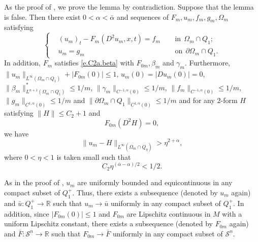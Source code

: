 \documentclass[preprint,12pt]{elsarticle}
\theoremstyle{definition}
\theoremstyle{remark}
\numberwithin{equation}{section}
\begin{document}
\proof As the proof of , we prove the lemma by contradiction. Suppose that the lemma is false. Then there exist $0<\alpha<\bar{\alpha}$ and sequences of $F_m,u_m,f_m,g_m,\Omega_m$ satisfying
\begin{equation*}
\left\{\begin{aligned}
&(u_m)_t-F_m(D^2u_m,x,t)=f_m&& ~~\mbox{in}~~\Omega_m\cap Q_1;\\
&u_m=g_m&& ~~\mbox{on}~~\partial \Omega_m\cap Q_1.
\end{aligned}\right.
\end{equation*}
In addition, $F_m$ satisfies \cref{e.C2a.beta} with $F_{0m},\beta_m$ and $\gamma_m$. Furthermore, $\|u_m\|_{L^{\infty}(\Omega_m\cap Q_1)}+|F_{0m}(0)|\leq 1$, $u_m(0)=|Du_m(0)|=0$, $\|\beta_m\|^*_{L^{n+1}(\Omega_m\cap Q_1)}\leq 1/m$, $\|\gamma_m\|_{C^{-1,\alpha}(0)}\leq 1/m$, $\|f_m\|_{C^{-1,\alpha}(0)}\leq 1/m$, $\|g_m\|_{C^{1,\alpha}(0)}\leq 1/m$ and $\|\partial \Omega_m\cap Q_1\|_{C^{1,\alpha}(0)} \leq 1/m$ and for any $2$-form $H$ satisfying $\|H\|\leq C_2+1$ and
\begin{equation}\label{e.lC2a.K1}
F_{0m}(D^2 H)=0,
\end{equation}
we have
\begin{equation}\label{e.lC2a.K2}
  \|u_m-H\|_{L^{\infty}(\Omega_{m}\cap Q_{\eta})}> \eta^{2+\alpha},
\end{equation}
where $0<\eta<1$ is taken small such that
\begin{equation}\label{e.lC2a.K3}
C_2\eta^{(\bar{\alpha}-\alpha)/2}<1/2.
\end{equation}

As in the proof of , $u_m$ are uniformly bounded and equicontinuous in any compact subset of $Q_1^+$. Thus, there exists a subsequence (denoted by $u_m$ again) and $\bar u: Q_1^+\rightarrow \mathbb R$ such that $u_m\rightarrow \bar u$ uniformly in any compact subset of $Q^+_1$. In addition, since $|F_{0m}(0)|\leq 1$ and $F_{0m}$ are Lipschitz continuous in $M$ with a uniform Lipschitz constant, there exists a subsequence (denoted by $F_{0m}$ again) and $\bar F:\mathcal {S}^{n}\rightarrow \mathbb R$ such that $F_{0m}\rightarrow \bar F$ uniformly in any compact subset of $\mathcal {S}^{n}$.
\end{document}
